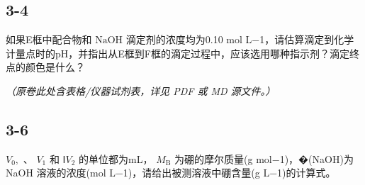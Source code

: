\subsection*{3-4}
如果E框中配合物和 $\mathrm { N a O H }$ 滴定剂的浓度均为0.10 mol L−1，请估算滴定到化学计量点时的pH，并指出从E框到F框的滴定过程中，应该选⽤哪种指⽰剂？滴定终点的颜⾊是什么？

\textit{（原卷此处含表格/仪器试剂表，详见 PDF 或 MD 源文件。）}

\subsection*{3-6}
$V _ { 0 } ,$ 、 $V _ { 1 }$ 和 $\mathsf { I } V _ { 2 }$ 的单位都为mL， $M _ { \mathrm { B } }$ 为硼的摩尔质量(g mol−1)，�(NaOH)为 NaOH 溶液的浓度(mol L−1)，请给出被测溶液中硼含量(g L−1)的计算式。
